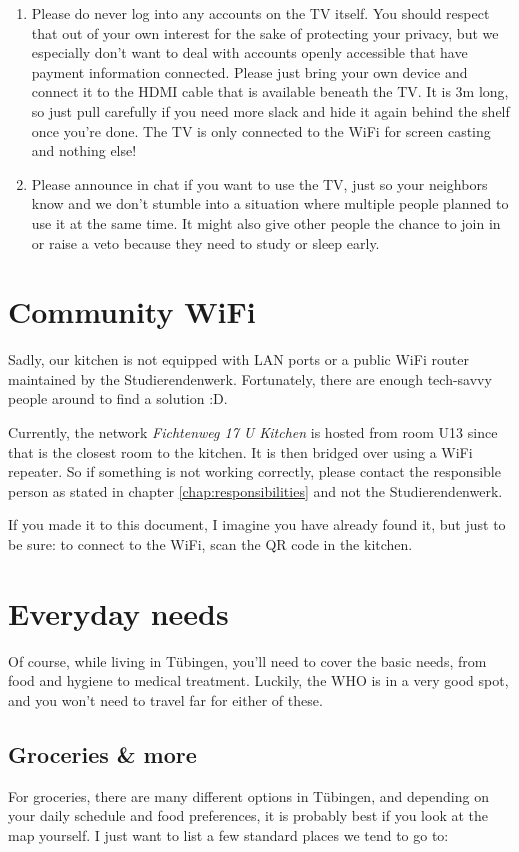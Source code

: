 \begin{enumerate}
    \item Please do never log into any accounts on the TV itself. You should respect that out of your own interest for the sake of protecting your privacy, but we especially don’t want to deal with accounts openly accessible that have payment information connected. Please just bring your own device and connect it to the HDMI cable that is available beneath the TV. It is 3m long, so just pull carefully if you need more slack and hide it again behind the shelf once you're done. The TV is only connected to the WiFi for screen casting and nothing else!

    \item Please announce in chat if you want to use the TV, just so your neighbors know and we don’t stumble into a situation where multiple people planned to use it at the same time. It might also give other people the chance to join in or raise a veto because they need to study or sleep early.
\end{enumerate}

\section{Community WiFi} \label{sec:wifi}
Sadly, our kitchen is not equipped with LAN ports or a public WiFi router maintained by the Studierendenwerk. Fortunately, there are enough tech-savvy people around to find a solution :D.

Currently, the network \textit{Fichtenweg 17 U Kitchen} is hosted from room U13 since that is the closest room to the kitchen. It is then bridged over using a WiFi repeater. So if something is not working correctly, please contact the responsible person as stated in chapter \ref{chap:responsibilities} and not the Studierendenwerk.

If you made it to this document, I imagine you have already found it, but just to be sure: to connect to the WiFi, scan the QR code in the kitchen.

\section{Everyday needs}
Of course, while living in Tübingen, you'll need to cover the basic needs, from food and hygiene to medical treatment. Luckily, the WHO is in a very good spot, and you won't need to travel far for either of these.  

\subsection{Groceries \& more}
For groceries, there are many different options in Tübingen, and depending on your daily schedule and food preferences, it is probably best if you look at the map yourself. I just want to list a few standard places we tend to go to:

